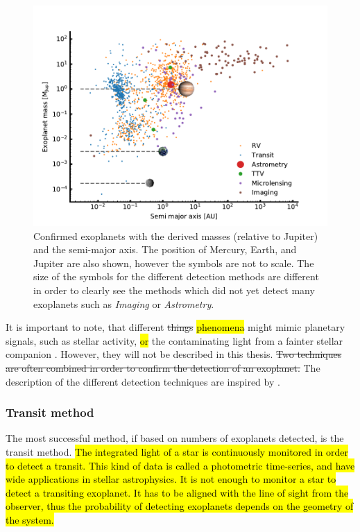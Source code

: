 \begin{figure}[htpb!]
    \centering
    \includegraphics[width=1.0\linewidth]{figures/exoplanetDetectionType.pdf}
    \caption{Confirmed exoplanets with the derived masses (relative to Jupiter) and the semi-major
             axis. The position of Mercury, Earth, and Jupiter are also shown, however the symbols
             are not to scale. The size of the symbols for the different detection methods are
             different in order to clearly see the methods which did not yet detect many exoplanets
             such as \emph{Imaging} or \emph{Astrometry}.}
    \label{fig:detectionTypes}
\end{figure}

It is important to note, that different \st{things} \hl{phenomena} might mimic planetary signals,
such as stellar activity, \hl{or} the contaminating light from a fainter stellar companion
\citep[see e.g.][]{Queloz2001,Oshagh2013,Oshagh2014}. However, they will not be described in this
thesis. \st{Two techniques are often combined in order to confirm the detection of an exoplanet.}
The description of the different detection techniques are inspired by \citet{Seager2010}.


\subsubsection{Transit method}
\label{sec:transitMethod}

The most successful method, if based on numbers of exoplanets detected, is the transit method.
\hl{The integrated light of a star is continuously monitored in order to detect a transit. This kind
of data is called a photometric time-series, and have wide applications in stellar astrophysics. It
is not enough to monitor a star to detect a transiting exoplanet. It has to be aligned with the line
of sight from the observer, thus the probability of detecting exoplanets depends on the geometry of
the system.}

